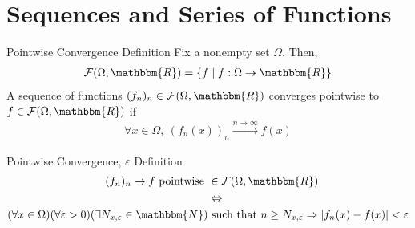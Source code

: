 \documentclass[10pt]{extarticle}
\newcommand{\N}{\mathbbm{N}}
\newcommand{\R}{\mathbbm{R}}
\begin{document}
  \section*{Sequences and Series of Functions}%
  \begin{problem}{Pointwise Convergence Definition}
    Fix a nonempty set $\Omega$. Then,
    \begin{align*}
      \mathcal{F}(\Omega,\R) = \left\{f\mid f: \Omega \rightarrow \R\right\}
    \end{align*}
    A sequence of functions $(f_n)_n\in \mathcal{F}(\Omega,\R)$ converges pointwise to $f\in \mathcal{F}(\Omega,\R)$ if
    \begin{align*}
      \forall x\in\Omega,~(f_n(x))_n \xrightarrow{n\rightarrow\infty}f(x)
    \end{align*}
  \end{problem}
  \begin{problem}{Pointwise Convergence, $\varepsilon$ Definition}
    \begin{align*}
      (f_n)_n \rightarrow f \text{ pointwise } &\in \mathcal{F}(\Omega,\R)\\
                                               &\Leftrightarrow\\
      (\forall x\in\Omega)(\forall \varepsilon > 0) (\exists N_{x,\varepsilon}\in\N) &\text{ such that } n\geq N_{x,\varepsilon} \Rightarrow \left|f_n(x) - f(x)\right| < \varepsilon
    \end{align*}
  \end{problem}
\end{document}
